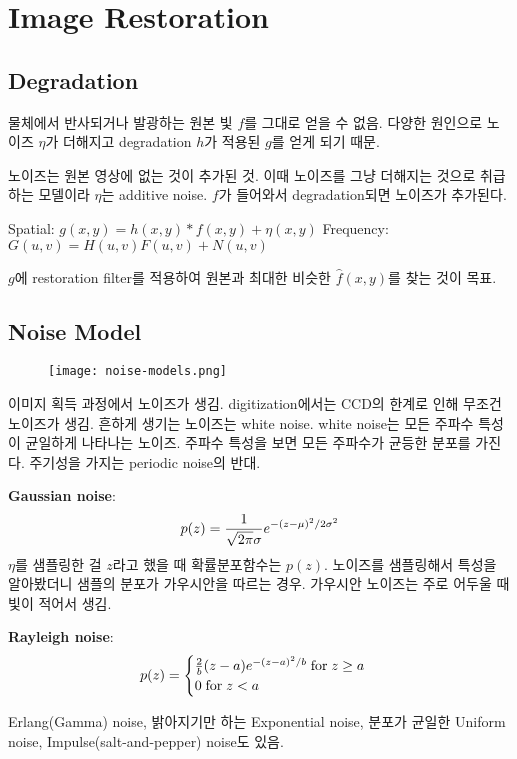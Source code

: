 \section{Image Restoration}

\subsection{Degradation}

물체에서 반사되거나 발광하는 원본 빛 $f$를 그대로 얻을 수 없음. 다양한 원인으로 노이즈 $\eta$가 더해지고 degradation $h$가 적용된 $g$를 얻게 되기 때문.

노이즈는 원본 영상에 없는 것이 추가된 것. 이때 노이즈를 그냥 더해지는 것으로 취급하는 모델이라 $\eta$는 additive noise. $f$가 들어와서 degradation되면 노이즈가 추가된다.

\bitmz
  \itm Spatial: $g(x, y) = h(x, y) \ast f(x, y) + \eta (x, y)$
  \itm Frequency: $G(u, v) = H(u, v)F(u, v) + N(u, v)$
\eitmz

$g$에 restoration filter를 적용하여 원본과 최대한 비슷한 $\hat{f}(x, y)$를 찾는 것이 목표.

\subsection{Noise Model}

\begin{figure}[h]
  \centering
  \texttt{[image: noise-models.png]}
\end{figure}

이미지 획득 과정에서 노이즈가 생김. digitization에서는 CCD의 한계로 인해 무조건 노이즈가 생김. 흔하게 생기는 노이즈는 white noise. white noise는 모든 주파수 특성이 균일하게 나타나는 노이즈. 주파수 특성을 보면 모든 주파수가 균등한 분포를 가진다. 주기성을 가지는 periodic noise의 반대.

\textbf{Gaussian noise}:
$$p(z) = {1 \over \sqrt{2\pi}\sigma} e^{-(z - \mu)^2/2\sigma^2}$$
$\eta$를 샘플링한 걸 $z$라고 했을 때 확률분포함수는 $p(z)$. 노이즈를 샘플링해서 특성을 알아봤더니 샘플의 분포가 가우시안을 따르는 경우. 가우시안 노이즈는 주로 어두울 때 빛이 적어서 생김.

\textbf{Rayleigh noise}:
$$p(z) = \begin{cases} {2 \over b}(z - a)e^{-(z - a)^2 / b} \; \text{for} \; z \geq a \\ 0 \; \text{for} \; z < a \end{cases}$$

Erlang(Gamma) noise, 밝아지기만 하는 Exponential noise, 분포가 균일한 Uniform noise, Impulse(salt-and-pepper) noise도 있음.

